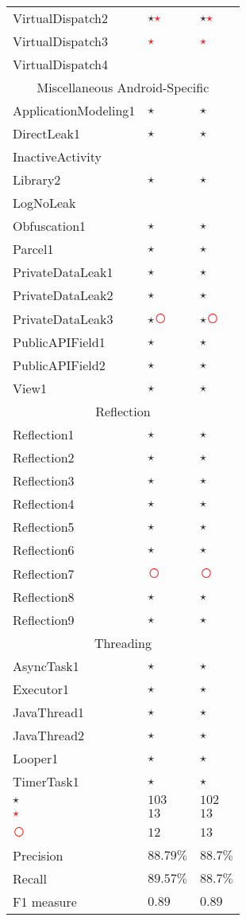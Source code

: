 \documentclass[../draft.tex]{subfiles}
\newcommand{\fp}{\textcolor{white}{\textcircled{\textcolor{red}{$\star$}}}}
\newcommand{\fn}{\textcolor{red}{\textcircled{ }}}
\newcommand{\tp}[0]{\textcircled{$\star$}}
\newcommand{\tsub}[1]{\multicolumn{3}{c}{#1}\\\hline}
\begin{document}
\begin{longtable}{l | l | l}
        VirtualDispatch2 & \tp \fp & \tp \fp\\
        VirtualDispatch3 & \fp & \fp\\
        VirtualDispatch4 & &\\
        \hline
        \tsub{Miscellaneous Android-Specific}
        ApplicationModeling1 & \tp & \tp\\
        DirectLeak1 & \tp & \tp\\
        InactiveActivity &  & \\
        Library2 & \tp & \tp\\
        LogNoLeak & & \\
        Obfuscation1 & \tp & \tp\\
        Parcel1 & \tp & \tp\\
        PrivateDataLeak1 & \tp & \tp\\
        PrivateDataLeak2 & \tp & \tp\\
        PrivateDataLeak3 & \tp \fn & \tp \fn\\
        PublicAPIField1 & \tp & \tp\\
        PublicAPIField2 & \tp & \tp\\
        View1 & \tp & \tp\\
        \hline
        \tsub{Reflection}
        Reflection1 & \tp & \tp\\
        Reflection2 & \tp & \tp\\
        Reflection3 & \tp & \tp\\
        Reflection4 & \tp & \tp\\
        Reflection5 & \tp & \tp\\
        Reflection6 & \tp & \tp\\
        Reflection7 & \fn & \fn\\
        Reflection8 & \tp & \tp\\
        Reflection9 & \tp & \tp\\
        \hline
        \tsub{Threading}
        AsyncTask1 & \tp & \tp\\
        Executor1 & \tp & \tp\\
        JavaThread1 & \tp & \tp\\
        JavaThread2 & \tp & \tp\\
        Looper1 & \tp & \tp\\
        TimerTask1 & \tp & \tp\\
        \hline\hline  %
        \tp &$ 103 $&$ 102 $\\
        \fp &$ 13 $&$ 13 $\\
        \fn &$ 12 $&$ 13 $\\
        Precision & $ 88.79 \%$ & $ 88.7 \%$\\
        Recall & $ 89.57 \% $ & $ 88.7 \%$\\
        F1 measure & $ 0.89 $ & $ 0.89 $\\
    \end{longtable}
\end{document}
